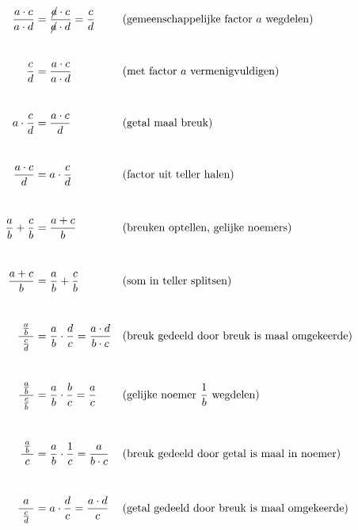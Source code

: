 \documentclass{ximera}
\begin{document}
\begin{proposition}\label{eig:rekenregels_breuken}
{
\allowdisplaybreaks
\addtolength{\jot}{-2mm}  %
\begin{align*}
        \frac{a\cdot c}{a\cdot d} &=    \frac{\cancel{a}\cdot c}{\cancel{a}\cdot d} = \frac{c}{d}
            && \text{(gemeenschappelijke factor $a$ wegdelen)} \\[3mm]
            \\
         \frac{c}{d}    &= \frac{a\cdot c}{a\cdot d}
            && \text{(met factor $a$ vermenigvuldigen)} \\[3mm]
            \\
        a\cdot \frac{c}{d}   &= \frac{a\cdot c}{d}
            && \text{(getal maal breuk)}  \\[3mm]
            \\
        \frac{a\cdot c}{d}   &= a\cdot \frac{c}{d}
            && \text{(factor uit teller halen)} \\[3mm]
            \\
        \frac{a}{b}+\frac{c}{b}  &= \frac{a+c}{b}
            && \text{(breuken optellen, gelijke noemers)} \\[3mm]
            \\
        \frac{a+c}{b} &= \frac{a}{b}+\frac{c}{b}
            && \text{(som in teller splitsen)}\\[3mm] %
            \\
        \frac{\frac{a}{b}}{\ \frac{c}{d}\ } &= \frac ab \cdot \frac dc =  \frac{a\cdot d}{b\cdot c}
            && \text{(breuk gedeeld door breuk is maal omgekeerde)}\\[3mm]
            \\
        \frac{\frac{a}{b}}{\ \frac{c}{b}\ } &= \frac ab \cdot \frac bc =  \frac{a}{c}
            && \text{(gelijke noemer $\frac 1b$  wegdelen)}\\[3mm]
            \\
        \frac{\frac{a}{b}}{\ c\ } &= \frac ab \cdot \frac 1c = \frac{a}{b\cdot c}
            && \text{(breuk gedeeld door getal is maal in noemer)}\\[3mm]
            \\
        \frac{a}{\ \frac{c}{d}\ } &= a\cdot \frac dc = \frac{a\cdot d}{c}
            && \text{(getal gedeeld door breuk is maal omgekeerde)}
\end{align*}
}

\end{proposition}
\end{document}
